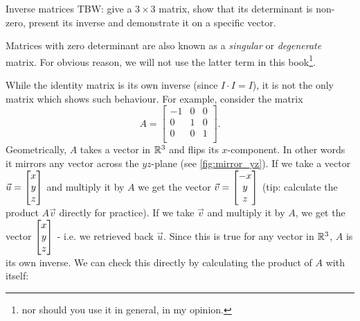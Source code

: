 \begin{example}{Inverse matrices}{}
	TBW: give a $3\times3$ matrix, show that its determinant is non-zero, present its inverse and demonstrate it on a specific vector.
\end{example}

Matrices with zero determinant are also known as a \emph{singular} or \emph{degenerate} matrix. For obvious reason, we will not use the latter term in this book\footnote{nor should you use it in general, in my opinion.}.

While the identity matrix is its own inverse (since $I\cdot I=I$), it is not the only matrix which shows such behaviour. For example, consider the matrix
\[
	A =
	\begin{bmatrix}
		-1 & 0 & 0\\
		 0 & 1 & 0\\
		 0 & 0 & 1\\
	\end{bmatrix}.
\]
Geometrically, $A$ takes a vector in $\mathbb{R}^{3}$ and flips its $x$-component. In other words it mirrors any vector across the $yz$-plane (see \autoref{fig:mirror_yz}). If we take a vector $\vec{u}=\colvec{x;y;z}$ and multiply it by $A$ we get the vector $\vec{v}=\colvec{-x;y;z}$ (tip: calculate the product $A\vec{v}$ directly for practice). If we take $\vec{v}$ and multiply it by $A$, we get the vector $\colvec{x;y;z}$ - i.e. we retrieved back $\vec{u}$. Since this is true for any vector in $\mathbb{R}^{3}$, $A$ is its own inverse. We can check this directly by calculating the product of $A$ with itself:
